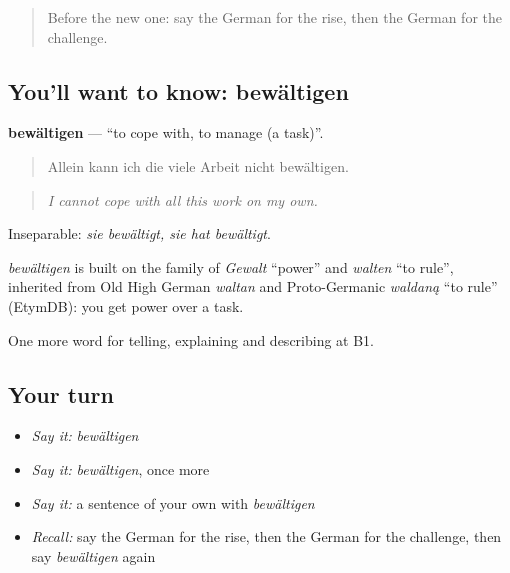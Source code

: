 \label{lesson:GE-C356-bewaeltigen}



\begin{quote}
Before the new one: say the German for the rise, then the German for the challenge.
\end{quote}

\subsection*{You'll want to know: bewältigen}
\textbf{bewältigen} — \textquotedblleft{}to cope with, to manage (a task)\textquotedblright{}.

\begin{quote}
Allein kann ich die viele Arbeit nicht bewältigen.
\end{quote}

\begin{quote}
\emph{I cannot cope with all this work on my own.}
\end{quote}

Inseparable: \emph{sie bewältigt, sie hat bewältigt}.

\begin{cousinweb}
\emph{bewältigen} is built on the family of \emph{Gewalt} \textquotedblleft{}power\textquotedblright{} and \emph{walten} \textquotedblleft{}to rule\textquotedblright{}, inherited from Old High German \emph{waltan} and Proto-Germanic \emph{waldaną} \textquotedblleft{}to rule\textquotedblright{} (EtymDB): you get power over a task.
\end{cousinweb}

\begin{grammarlens}[title={What you've built}]
One more word for telling, explaining and describing at B1.
\end{grammarlens}

\subsection*{Your turn}
\begin{itemize}
\raggedright
  \item \emph{Say it:} \emph{bewältigen}
  \item \emph{Say it:} \emph{bewältigen}, once more
  \item \emph{Say it:} a sentence of your own with \emph{bewältigen}
  \item \emph{Recall:} say the German for the rise, then the German for the challenge, then say \emph{bewältigen} again
\end{itemize}

